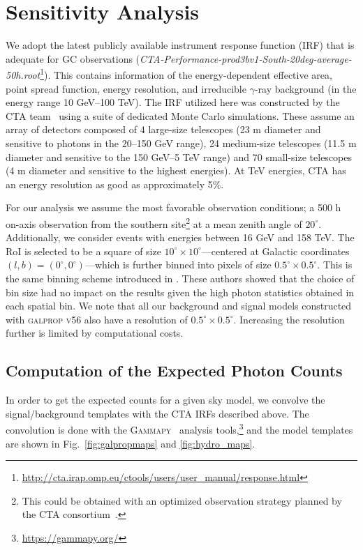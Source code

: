 \documentclass[doublespace,nopageskip]{VTthesis} %
\begin{document}
\section{Sensitivity Analysis}
\label{sec:sensitivity}

We adopt the latest publicly available instrument response function (IRF) that is adequate for GC observations (\textit{CTA-Performance-prod3bv1-South-20deg-average-50h.root}\footnote{\url{http://cta.irap.omp.eu/ctools/users/user_manual/response.html}}). This contains information of the energy-dependent effective area, point spread function, energy resolution, and irreducible $\gamma$-ray background (in the energy range 10 GeV--100 TeV). The IRF utilized here was constructed by the CTA team~\citep{CTA_IRFs:2015} using a suite of dedicated Monte Carlo simulations. These assume an array of detectors composed of 4 large-size telescopes (23 m diameter and sensitive to photons in the 20--150 GeV range),  24 medium-size telescopes (11.5 m diameter and sensitive to the 150 GeV--5 TeV range) and 70 small-size telescopes (4 m diameter and sensitive to the highest energies). At TeV energies, CTA has an energy resolution as good as approximately 5\%.


For our analysis we assume the most favorable observation conditions; a 500 h on-axis observation from the southern site\footnote{This could be obtained with an optimized observation strategy planned by the CTA consortium~\citep{Acharyya:2020sbj}.} at a mean zenith angle of $20^\circ$. Additionally, we consider events with energies between 16 GeV and 158 TeV. The RoI is selected to be a square of size $10^\circ \times 10^\circ$---centered at Galactic coordinates $(l,b)=(0^\circ, 0^\circ)$---which is further binned into pixels of size $0.5^\circ \times 0.5^\circ$. This is the same binning scheme introduced in \cite{Rinchiuso:2020skh}. These authors showed that the choice of bin size had no impact on the results given the high photon statistics obtained in each spatial bin. We note that all our background and signal models constructed with \textsc{galprop v56} also have a resolution of $0.5^\circ \times 0.5^\circ$. Increasing the resolution further is limited by computational costs.  

\subsection{Computation of the Expected Photon Counts }
\label{subsec:expectedcounts}

In order to get the expected counts for a given sky model, we convolve the signal/background templates with the CTA IRFs described above. The convolution is done with the \textsc{Gammapy}~\citep{gammapy:2017,gammapy:2019} analysis tools,\footnote{\url{https://gammapy.org/}} and the model templates are shown in Fig.~\ref{fig:galpropmaps} and \ref{fig:hydro_maps}.
\end{document}
